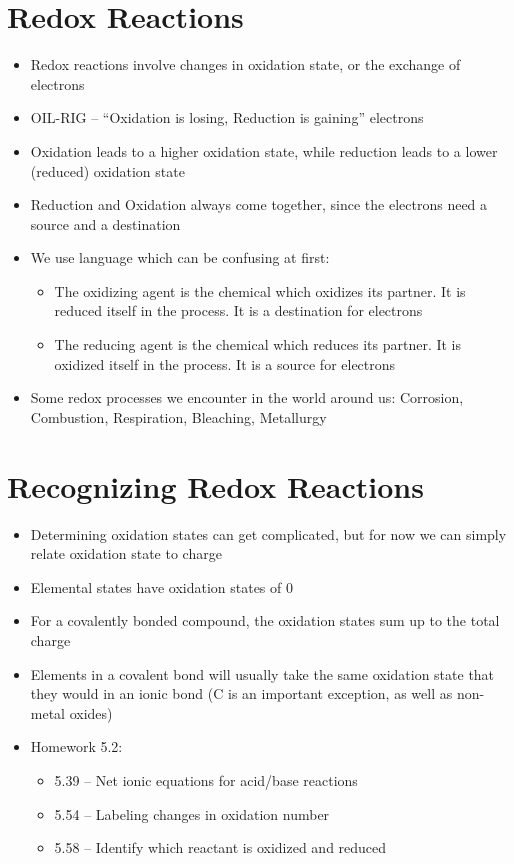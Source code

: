 \documentclass[12pt, openany, letterpaper]{memoir}
\begin{document}
\section{Redox Reactions}
\begin{itemize}
	\item Redox reactions involve changes in oxidation state, or the exchange of electrons
	\item OIL-RIG -- ``Oxidation is losing, Reduction is gaining'' electrons
	\item Oxidation leads to a higher oxidation state, while reduction leads to a lower (reduced) oxidation state
	\item Reduction and Oxidation always come together, since the electrons need a source and a destination
	\item We use language which can be confusing at first:
	      \begin{itemize}
		      \item The oxidizing agent is the chemical which oxidizes its partner. It is reduced itself in the process. It is a destination for electrons
		      \item The reducing agent is the chemical which reduces its partner. It is oxidized itself in the process. It is a source for electrons
	      \end{itemize}
	\item Some redox processes we encounter in the world around us: Corrosion, Combustion, Respiration, Bleaching, Metallurgy
\end{itemize}
\section{Recognizing Redox Reactions}
\begin{itemize}
	\item Determining oxidation states can get complicated, but for now we can simply relate oxidation state to charge
	\item Elemental states have oxidation states of 0
	\item For a covalently bonded compound, the oxidation states sum up to the total charge
	\item Elements in a covalent bond will usually take the same oxidation state that they would in an ionic bond (C is an important exception, as well as non-metal oxides)
	\item Homework 5.2:
	      \begin{itemize}
		      \item 5.39 -- Net ionic equations for acid/base reactions
		      \item 5.54 -- Labeling changes in oxidation number
		      \item 5.58 -- Identify which reactant is oxidized and reduced
	      \end{itemize}
\end{itemize}
\end{document}
